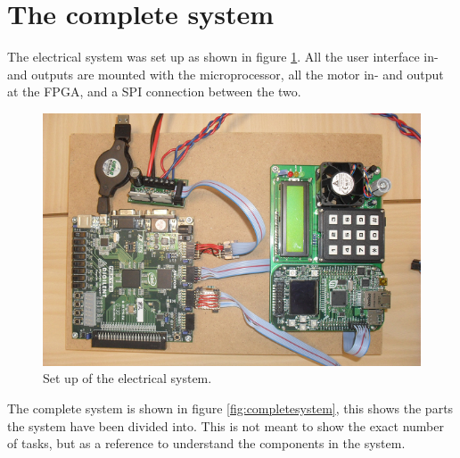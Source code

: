 \section{The complete system}

The electrical system was set up as shown in figure \ref{fig:digitalsystem}. All the user interface in- and outputs are mounted with the microprocessor, all the motor in- and output at the FPGA, and a SPI connection between the two.

\begin{figure}[htb]
	\centering
	\includegraphics[width=\textwidth]{graphics/digitalsystem.png} %
	\caption{Set up of the electrical system.}
	\label{fig:digitalsystem}			%
\end{figure}


The complete system is shown in figure \ref{fig:completesystem}, this shows the parts the system have been divided into. This is not meant to show the exact number of tasks, but as a reference to understand the components in the system.


